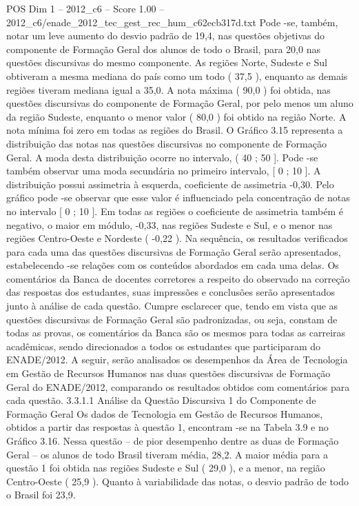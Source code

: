 \begin{textsample}{POS Dim 1 – 2012\_c6 – Score 1.00 – 2012\_c6/enade\_2012\_tec\_gest\_rec\_hum\_c62ecb317d.txt}
Pode -se, também, notar um leve aumento do desvio padrão de 19,4, nas questões objetivas do componente de Formação Geral dos alunos de todo o Brasil, para 20,0 nas questões discursivas do mesmo componente.
As regiões Norte, Sudeste e Sul obtiveram a mesma mediana do país como um todo ( 37,5 ), enquanto as demais regiões tiveram mediana igual a 35,0.
A nota máxima ( 90,0 ) foi obtida, nas questões discursivas do componente de Formação Geral, por pelo menos um aluno da região Sudeste, enquanto o menor valor ( 80,0 ) foi obtido na região Norte.
A nota mínima foi zero em todas as regiões do Brasil.
O Gráfico 3.15 representa a distribuição das notas nas questões discursivas no componente de Formação Geral.
A moda desta distribuição ocorre no intervalo, ( 40 ; 50 ].
Pode -se também observar uma moda secundária no primeiro intervalo, [ 0 ; 10 ].
A distribuição possui assimetria à esquerda, coeficiente de assimetria -0,30.
Pelo gráfico pode -se observar que esse valor é influenciado pela concentração de notas no intervalo [ 0 ; 10 ].
Em todas as regiões o coeficiente de assimetria também é negativo, o maior em módulo, -0,33, nas regiões Sudeste e Sul, e o menor nas regiões Centro-Oeste e Nordeste ( -0,22 ).
Na sequência, os resultados verificados para cada uma das questões discursivas de Formação Geral serão apresentados, estabelecendo -se relações com os conteúdos abordados em cada uma delas.
Os comentários da Banca de docentes corretores a respeito do observado na correção das respostas dos estudantes, suas impressões e conclusões serão apresentados junto à análise de cada questão.
Cumpre esclarecer que, tendo em vista que as questões discursivas de Formação Geral são padronizadas, ou seja, constam de todas as provas, os comentários da Banca são os mesmos para todas as carreiras acadêmicas, sendo direcionados a todos os estudantes que participaram do ENADE/2012.
A seguir, serão analisados os desempenhos da Área de Tecnologia em Gestão de Recursos Humanos nas duas questões discursivas de Formação Geral do ENADE/2012, comparando os resultados obtidos com comentários para cada questão. 3.3.1.1 Análise da Questão Discursiva 1 do Componente de Formação Geral Os dados de Tecnologia em Gestão de Recursos Humanos, obtidos a partir das respostas à questão 1, encontram -se na Tabela 3.9 e no Gráfico 3.16.
Nessa questão – de pior desempenho dentre as duas de Formação Geral – os alunos de todo Brasil tiveram média, 28,2.
A maior média para a questão 1 foi obtida nas regiões Sudeste e Sul ( 29,0 ), e a menor, na região Centro-Oeste ( 25,9 ).
Quanto à variabilidade das notas, o desvio padrão de todo o Brasil foi 23,9.

\end{textsample}
